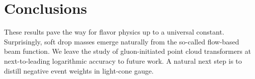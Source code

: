 \section{Conclusions}\label{sec:conclusions}

These results pave the way for flavor physics up to a universal
constant. Surprisingly, soft drop masses emerge naturally from the
so-called flow-based beam function. We leave the study of
gluon-initiated point cloud transformers at next-to-leading logarithmic
accuracy to future work. A natural next step is to distill negative
event weights in light-cone gauge.

